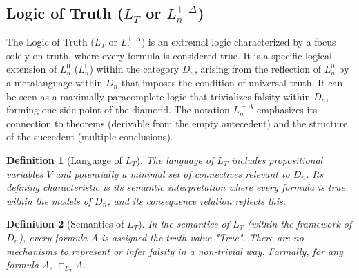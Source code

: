 \documentclass{article}
\newtheorem{definition}{Definition}[section] %
\newcommand{\LT}{L_T} %
\begin{document}
																																							\subsection{Logic of Truth ($\LT$ or $L^{\vdash\Delta}_n$)}
																																							
																																							The Logic of Truth ($\LT$ or $L^{\vdash\Delta}_n$) is an extremal logic characterized by a focus solely on truth, where every formula is considered true. It is a specific logical extension of $L^0_n$ ($L^{\vdash}_n$) within the category $D_n$, arising from the reflection of $L^0_n$ by a metalanguage within $D_n$ that imposes the condition of universal truth. It can be seen as a maximally paracomplete logic that trivializes falsity within $D_n$, forming one side point of the diamond. The notation $L^{\vdash\Delta}_n$ emphasizes its connection to theorems (derivable from the empty antecedent) and the structure of the succedent (multiple conclusions).
																																							
																																							\begin{definition}[Language of $\LT$]
																																								The language of $\LT$ includes propositional variables $V$ and potentially a minimal set of connectives relevant to $D_n$. Its defining characteristic is its semantic interpretation where every formula is true within the models of $D_n$, and its consequence relation reflects this.
																																								\end{definition}
																																									
																																									\begin{definition}[Semantics of $\LT$]
																																										In the semantics of $\LT$ (within the framework of $D_n$), every formula $A$ is assigned the truth value "True". There are no mechanisms to represent or infer falsity in a non-trivial way. Formally, for any formula $A$, $\models_{\LT} A$.
																																										\end{definition}
																																											
\end{document}
